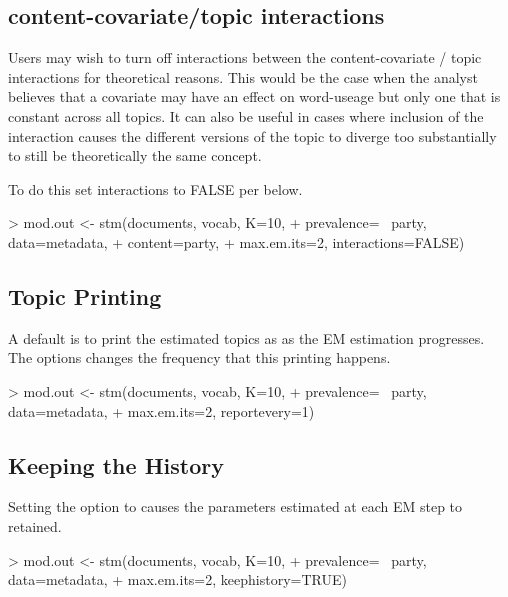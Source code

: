 \documentclass[nojss]{jss}
\begin{document}
\subsection{content-covariate/topic interactions}
Users may wish to turn off interactions between the content-covariate / topic interactions for theoretical reasons.  This would be the case when the analyst believes that a covariate may have an effect on word-useage but only one that is constant across all topics.  It can also be useful in cases where inclusion of the interaction causes the different versions of the topic to diverge too substantially to still be theoretically the same concept.

To do this set interactions to FALSE per below.
\begin{Schunk}
\begin{Sinput}
> mod.out <- stm(documents, vocab, K=10,
+                prevalence= ~party, data=metadata,
+                content=party,
+                max.em.its=2, interactions=FALSE)
\end{Sinput}
\end{Schunk}


\subsection{Topic Printing}

A default is to print the estimated topics as as the EM estimation progresses. The  options changes the frequency that this printing happens.
\begin{Schunk}
\begin{Sinput}
> mod.out <- stm(documents, vocab, K=10,
+                prevalence= ~party, data=metadata,
+                max.em.its=2, reportevery=1)
\end{Sinput}
\end{Schunk}


\subsection{Keeping the History}
Setting the option  to  causes the parameters estimated at each EM step to retained.

\begin{Schunk}
\begin{Sinput}
> mod.out <- stm(documents, vocab, K=10,
+                prevalence= ~party, data=metadata,
+                max.em.its=2, keephistory=TRUE)
\end{Sinput}
\end{Schunk}
\end{document}

